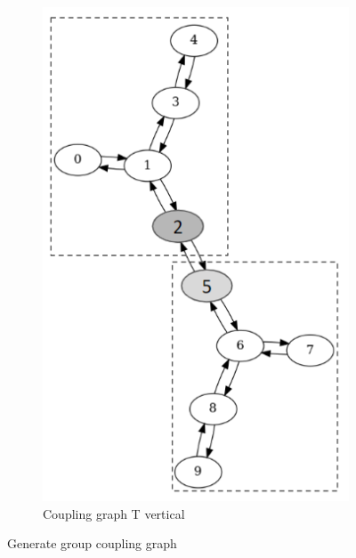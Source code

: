 \begin{figure}[!htb]
\begin{subfigure}{0.3\linewidth}
        \includegraphics[width=\linewidth]{image/coupling_graph_t_vertical.png}
        \caption{Coupling graph T vertical}
        \label{fig:coupling-graph-t-vertical}
    \end{subfigure}
    \caption{Generate group coupling graph}
\end{figure}